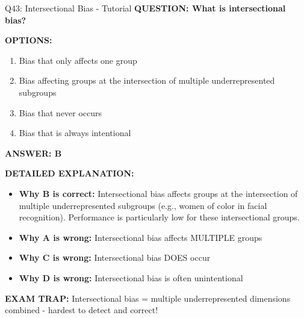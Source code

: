 \documentclass[8pt]{beamer}
\begin{document}
	\begin{frame}{Q43: Intersectional Bias - Tutorial}
		\fontsize{6.5}{7.5}\selectfont
		\textbf{QUESTION: What is intersectional bias?}
		
		\vspace{0.1cm}
		\textbf{OPTIONS:}
		\begin{enumerate}
			\item Bias that only affects one group
			\item Bias affecting groups at the intersection of multiple underrepresented subgroups
			\item Bias that never occurs
			\item Bias that is always intentional
		\end{enumerate}
		
		\vspace{0.1cm}
		\textcolor{myblue}{\textbf{ANSWER: B}}
		
		\vspace{0.1cm}
		\textbf{DETAILED EXPLANATION:}
		\begin{itemize}
			\item \textbf{Why B is correct:} Intersectional bias affects groups at the intersection of multiple underrepresented subgroups (e.g., women of color in facial recognition). Performance is particularly low for these intersectional groups.
			\item \textbf{Why A is wrong:} Intersectional bias affects MULTIPLE groups
			\item \textbf{Why C is wrong:} Intersectional bias DOES occur
			\item \textbf{Why D is wrong:} Intersectional bias is often unintentional
		\end{itemize}
		
		\textcolor{myred}{\textbf{EXAM TRAP:}} Intersectional bias = \textcolor{myblue}{multiple underrepresented dimensions combined} - hardest to detect and correct!
	\end{frame}
	
\end{document}
